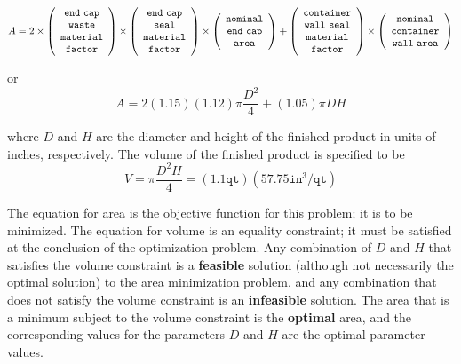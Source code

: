 \[
A=2 \times \left(\begin{array}{c}
    \mathtt{end\hbox{ }cap}\\
    \mathtt{waste}\\
    \mathtt{material}\\
    \mathtt{factor}
  \end{array} \right)
\times \left(\begin{array}{c}
    \mathtt{end\hbox{ }cap}\\
    \mathtt{seal}\\
    \mathtt{material}\\
    \mathtt{factor}
  \end{array} \right)
\times \left(\begin{array}{c}
    \mathtt{nominal}\\
    \mathtt{end\hbox{ }cap}\\
    \mathtt{area}
  \end{array} \right)
+ \left(\begin{array}{c}
    \mathtt{container}\\
    \mathtt{wall\hbox{ }seal}\\
    \mathtt{material}\\
    \mathtt{factor}
  \end{array} \right)
\times \left(\begin{array}{c}
    \mathtt{nominal}\\
    \mathtt{container}\\
    \mathtt{wall\hbox{ }area}
  \end{array} \right)
\]

or
\begin{equation}
A=2(1.15)(1.12)\pi\frac{D^2}{4}+(1.05)\pi DH \label{additional:contA}
\end{equation}

where $D$ and $H$ are the diameter and height of the finished product
in units of inches, respectively. The volume of the finished product
is specified to be
\begin{equation}
  V=\pi\frac{D^2H}{4}=(1.1\mathtt{qt})(57.75 \mathtt{in}^3/\mathtt{qt})
  \label{additional:contV}
\end{equation}

The equation for area is the objective function for this problem; it
is to be minimized. The equation for volume is an equality constraint;
it must be satisfied at the conclusion of the optimization problem.
Any combination of $D$ and $H$ that satisfies the volume constraint is
a \textbf{feasible} solution (although not necessarily the optimal
solution) to the area minimization problem, and any combination that
does not satisfy the volume constraint is an \textbf{infeasible}
solution. The area that is a minimum subject to the volume constraint
is the \textbf{optimal} area, and the corresponding values for the
parameters $D$ and $H$ are the optimal parameter values.

